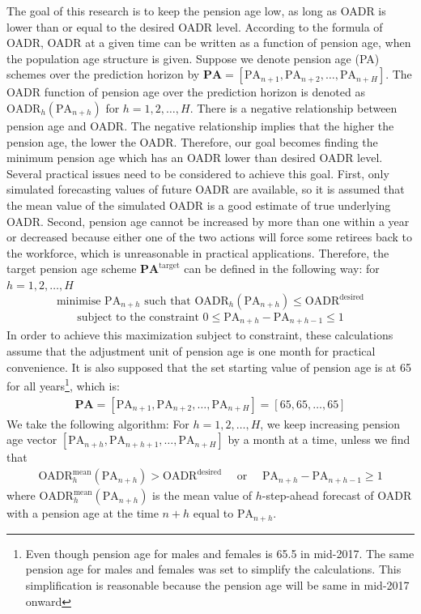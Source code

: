 \documentclass[11pt,a4paper,]{article}
\begin{document}
The goal of this research is to keep the pension age low, as long as OADR is lower than or equal to the desired OADR level. According to the formula of OADR, OADR at a given time can be written as a function of pension age, when the population age structure is given. Suppose we denote pension age (PA) schemes over the prediction horizon by \(\bm{\text{PA}}=[\text{PA}_{n+1}, \text{PA}_{n+2},\dots,\text{PA}_{n+H}]\). The OADR function of pension age over the prediction horizon is denoted as \(\text{OADR}_h(\text{PA}_{n+h})\) for \(h=1,2,\dots,H\). There is a negative relationship between pension age and OADR. The negative relationship implies that the higher the pension age, the lower the OADR. Therefore, our goal becomes finding the minimum pension age which has an OADR lower than desired OADR level. Several practical issues need to be considered to achieve this goal. First, only simulated forecasting values of future OADR are available, so it is assumed that the mean value of the simulated OADR is a good estimate of true underlying OADR. Second, pension age cannot be increased by more than one within a year or decreased because either one of the two actions will force some retirees back to the workforce, which is unreasonable in practical applications. Therefore, the target pension age scheme \(\bm{\text{PA}}^{\text{target}}\) can be defined in the following way:
for \(h=1,2,\dots,H\)
\begin{equation*}
  \text{minimise~} \text{PA}_{n+h}  \text{~such that~} \text{OADR}_h(\text{PA}_{n+h})\leq \text{OADR}^{\text{desired}}
\end{equation*}
\begin{align*}
  \text{subject to the constraint~} 0\leq \text{PA}_{n+h}-\text{PA}_{n+h-1}\leq 1
\end{align*}
In order to achieve this maximization subject to constraint, these calculations assume that the adjustment unit of pension age is one month for practical convenience. It is also supposed that the set starting value of pension age is at 65 for all years\footnote{Even though pension age for males and females is 65.5 in mid-2017. The same pension age for males and females was set to simplify the calculations. This simplification is reasonable because the pension age will be same in mid-2017 onward}, which is:
\vspace{-.3in}
\begin{align*}
  \bm{\text{PA}}=\left[\text{PA}_{n+1},\text{PA}_{n+2},\dots,\text{PA}_{n+H}\right] = \left[65,65,\dots,65\right]
\end{align*}
We take the following algorithm:
For \(h=1,2,\dots,H\), we keep increasing pension age vector \([\text{PA}_{n+h},\text{PA}_{n+h+1},\dots,\text{PA}_{n+H}]\) by a month at a time, unless we find that
\vspace{-.2in}
\begin{align*}
  \text{OADR}^{\text{mean}}_h(\text{PA}_{n+h})> \text{OADR}^{\text{desired}} \quad \text{~or~}\quad  \text{PA}_{n+h}-\text{PA}_{n+h-1}\geq 1
\end{align*}
where \(\text{OADR}^{\text{mean}}_h(\text{PA}_{n+h})\) is the mean value of \(h\)-step-ahead forecast of OADR with a pension age at the time \(n+h\) equal to \(\text{PA}_{n+h}\).
\end{document}
